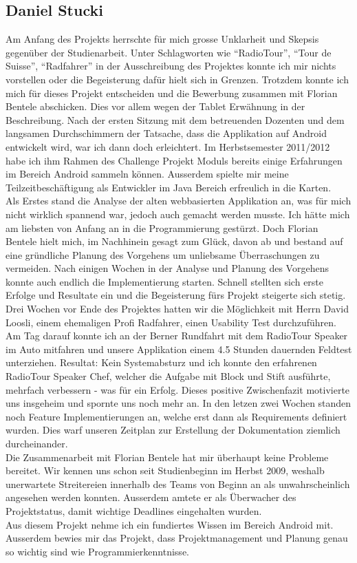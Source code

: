 \subsection{Daniel Stucki}
Am Anfang des Projekts herrschte für mich grosse Unklarheit und Skepsis gegenüber der Studienarbeit. Unter Schlagworten wie "`RadioTour"', "`Tour de Suisse"', "`Radfahrer"' in der Ausschreibung des Projektes konnte ich mir nichts vorstellen oder die Begeisterung dafür hielt sich in Grenzen. Trotzdem konnte ich mich für dieses Projekt entscheiden und die Bewerbung zusammen mit Florian Bentele abschicken. Dies vor allem wegen der Tablet Erwähnung in der Beschreibung. Nach der ersten Sitzung mit dem betreuenden Dozenten und dem langsamen Durchschimmern der Tatsache, dass die Applikation auf Android entwickelt wird, war ich dann doch erleichtert. Im Herbstsemester 2011/2012 habe ich ihm Rahmen des Challenge Projekt Moduls bereits einige Erfahrungen im Bereich Android sammeln können. Ausserdem spielte mir meine Teilzeitbeschäftigung als Entwickler im Java Bereich erfreulich in die Karten.
\\
Als Erstes stand die Analyse der alten webbasierten Applikation an, was für mich nicht wirklich spannend war, jedoch auch gemacht werden musste. Ich hätte mich am liebsten von Anfang an in die Programmierung gestürzt. Doch Florian Bentele hielt mich, im Nachhinein gesagt zum Glück, davon ab und bestand auf eine gründliche Planung des Vorgehens um unliebsame Überraschungen zu vermeiden. Nach einigen Wochen in der Analyse und Planung des Vorgehens konnte auch endlich die Implementierung starten. Schnell stellten sich erste Erfolge und Resultate ein und die Begeisterung fürs Projekt steigerte sich stetig. Drei Wochen vor Ende des Projektes hatten wir die Möglichkeit mit Herrn David Loosli, einem ehemaligen Profi Radfahrer, einen Usability Test durchzuführen. Am Tag darauf konnte ich an der Berner Rundfahrt mit dem RadioTour Speaker im Auto mitfahren und unsere Applikation einem 4.5 Stunden dauernden Feldtest unterziehen. Resultat: Kein Systemabsturz und ich konnte den erfahrenen RadioTour Speaker Chef, welcher die Aufgabe mit Block und Stift ausführte, mehrfach verbessern - was für ein Erfolg. Dieses positive Zwischenfazit motivierte uns insgeheim und spornte uns noch mehr an. In den letzen zwei Wochen standen noch Feature Implementierungen an, welche erst dann als Requirements definiert wurden. Dies warf unseren Zeitplan zur Erstellung der Dokumentation ziemlich durcheinander.
\\
Die Zusammenarbeit mit Florian Bentele hat mir überhaupt keine Probleme bereitet. Wir kennen uns schon seit Studienbeginn im Herbst 2009, weshalb unerwartete Streitereien innerhalb des Teams von Beginn an als unwahrscheinlich angesehen werden konnten. Ausserdem amtete er als Überwacher des Projektstatus, damit wichtige Deadlines eingehalten wurden.
\\
Aus diesem Projekt nehme ich ein fundiertes Wissen im Bereich Android mit. Ausserdem bewies mir das Projekt, dass Projektmanagement und Planung genau so wichtig sind wie Programmierkenntnisse.
 
